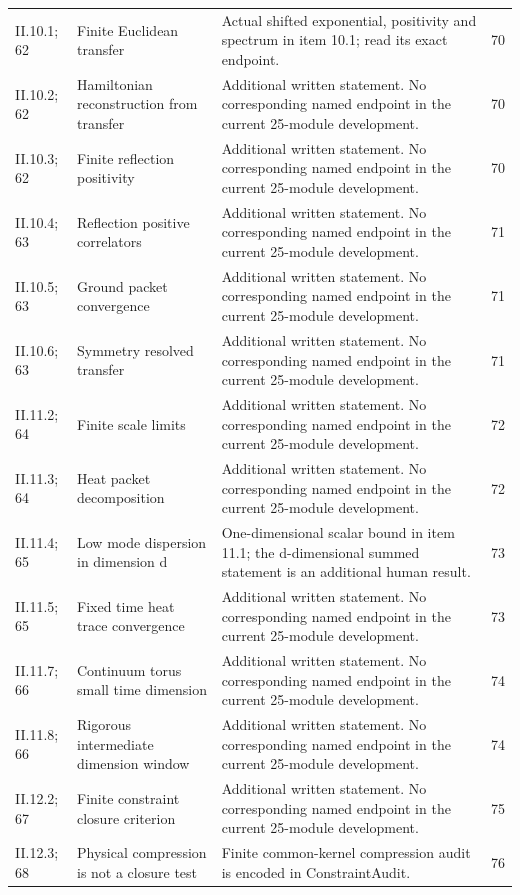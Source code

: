 {\begin{longtable}{@{}p{.13\linewidth}p{.31\linewidth}p{.42\linewidth}r@{}}
II.10.1; 62 & Finite Euclidean transfer & Actual shifted exponential, positivity and spectrum in item 10.1; read its exact endpoint. & 70\\
II.10.2; 62 & Hamiltonian reconstruction from transfer & Additional written statement. No corresponding named endpoint in the current 25-module development. & 70\\
II.10.3; 62 & Finite reflection positivity & Additional written statement. No corresponding named endpoint in the current 25-module development. & 70\\
II.10.4; 63 & Reflection positive correlators & Additional written statement. No corresponding named endpoint in the current 25-module development. & 71\\
II.10.5; 63 & Ground packet convergence & Additional written statement. No corresponding named endpoint in the current 25-module development. & 71\\
II.10.6; 63 & Symmetry resolved transfer & Additional written statement. No corresponding named endpoint in the current 25-module development. & 71\\
II.11.2; 64 & Finite scale limits & Additional written statement. No corresponding named endpoint in the current 25-module development. & 72\\
II.11.3; 64 & Heat packet decomposition & Additional written statement. No corresponding named endpoint in the current 25-module development. & 72\\
II.11.4; 65 & Low mode dispersion in dimension d & One-dimensional scalar bound in item 11.1; the d-dimensional summed statement is an additional human result. & 73\\
II.11.5; 65 & Fixed time heat trace convergence & Additional written statement. No corresponding named endpoint in the current 25-module development. & 73\\
II.11.7; 66 & Continuum torus small time dimension & Additional written statement. No corresponding named endpoint in the current 25-module development. & 74\\
II.11.8; 66 & Rigorous intermediate dimension window & Additional written statement. No corresponding named endpoint in the current 25-module development. & 74\\
II.12.2; 67 & Finite constraint closure criterion & Additional written statement. No corresponding named endpoint in the current 25-module development. & 75\\
II.12.3; 68 & Physical compression is not a closure test & Finite common-kernel compression audit is encoded in ConstraintAudit. & 76\\

\end{longtable}}
